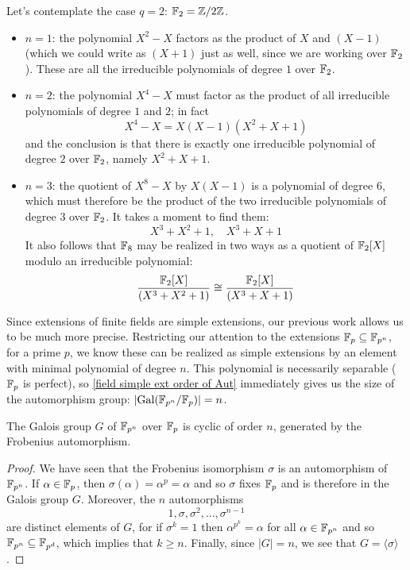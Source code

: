 \begin{example}
Let's contemplate the case $q=2$: $\mathbb{F}_2=\mathbb{Z}/2\mathbb{Z}$.
\begin{itemize}
\item $n=1$: the polynomial $X^2-X$ factors as the product of $X$ and $(X-1)$ (which we could write as $(X+1)$ just as well, since we are working over $\mathbb{F}_2$). These are all the irreducible polynomials of degree $1$ over $\mathbb{F}_2$.
\item $n=2$: the polynomial $X^4-X$ must factor as the product of all irreducible polynomials of degree $1$ and $2$; in fact
\[X^4-X=X(X-1)(X^2+X+1)\]
and the conclusion is that there is exactly one irreducible polynomial of degree $2$ over $\mathbb{F}_2$, namely $X^2+X+1$.
\item $n=3$: the quotient of $X^8-X$ by $X(X-1)$ is a polynomial of degree $6$, which must therefore be the product of the two irreducible polynomials of degree $3$ over $\mathbb{F}_2$. It takes a moment to find them:
\[X^3+X^2+1,\quad X^3+X+1\]
It also follows that $\mathbb{F}_8$ may be realized in two ways as a quotient of $\mathbb{F}_2[X]$ modulo an irreducible polynomial:
\[\dfrac{\mathbb{F}_2[X]}{(X^3+X^2+1)}\cong\dfrac{\mathbb{F}_2[X]}{(X^3+X+1)}\]
\end{itemize}
\end{example}
Since extensions of finite fields are simple extensions, our previous work allows us to be much more precise. Restricting our attention to the extensions $\mathbb{F}_p\subseteq\mathbb{F}_{p^n}$, for a prime $p$, we know these can be realized as simple extensions by an element with minimal polynomial of degree $n$. This polynomial is necessarily separable ($\mathbb{F}_p$ is perfect), so \cref{field simple ext order of Aut} immediately gives us the size of the automorphism group: $|\mathrm{Gal}(\mathbb{F}_{p^n}/\mathbb{F}_p)|=n$.
\begin{proposition}\label{finite field Galois generated by Frobenius}
The Galois group $G$ of $\mathbb{F}_{p^n}$ over $\mathbb{F}_p$ is cyclic of order $n$, generated by the Frobenius automorphism.
\end{proposition}
\begin{proof}
We have seen that the Frobenius isomorphism $\sigma$ is an automorphism of $\mathbb{F}_{p^n}$. If $\alpha\in\mathbb{F}_{p}$, then $\sigma(\alpha)=\alpha^p=\alpha$ and so $\sigma$ fixes $\mathbb{F}_{p}$ and is therefore in the Galois group $G$. Moreover, the $n$ automorphisms
\[1,\sigma,\sigma^2,\dots,\sigma^{n-1}\]
are distinct elements of $G$, for if $\sigma^k=1$ then $\alpha^{p^k}=\alpha$ for all $\alpha\in\mathbb{F}_{p^n}$ and so $\mathbb{F}_{p^n}\subseteq\mathbb{F}_{p^d}$, which implies that $k\geq n$. Finally, since $|G|=n$, we see that $G=\langle\sigma\rangle$.
\end{proof}
